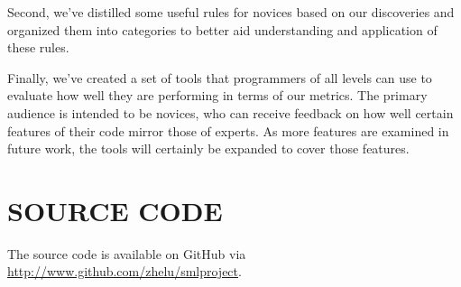 \documentclass[12pt,abstracton]{scrartcl}
\begin{document}
Second, we've distilled some useful rules for novices based
on our discoveries and organized them into categories
to better aid understanding and application of these rules.

Finally, we've created a set of tools that programmers of all levels
can use to evaluate how well they are performing in terms of our metrics.
The primary audience is intended to be novices,
who can receive feedback on how well certain features
of their code mirror those of experts. As more features are examined
in future work, the tools will certainly be expanded to cover those
features.
\section*{SOURCE CODE}
The source code is available on GitHub via \url{http://www.github.com/zhelu/smlproject}.
\end{document}

